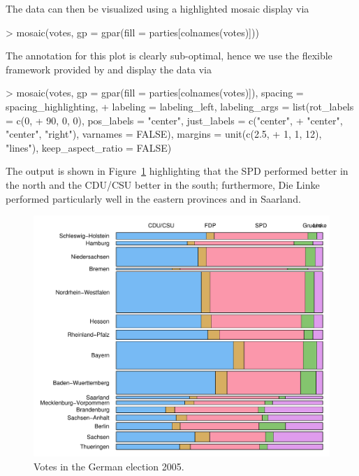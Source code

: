 \documentclass{Z}
\begin{document}
The data can then be visualized using a highlighted mosaic display via
\begin{Schunk}
\begin{Sinput}
> mosaic(votes, gp = gpar(fill = parties[colnames(votes)]))
\end{Sinput}
\end{Schunk}
The annotation for this plot is clearly sub-optimal, hence we use the 
flexible  framework provided by  and display
the data via
\begin{Schunk}
\begin{Sinput}
> mosaic(votes, gp = gpar(fill = parties[colnames(votes)]), spacing = spacing_highlighting, 
+     labeling = labeling_left, labeling_args = list(rot_labels = c(0, 
+         90, 0, 0), pos_labels = "center", just_labels = c("center", 
+         "center", "center", "right"), varnames = FALSE), margins = unit(c(2.5, 
+         1, 1, 12), "lines"), keep_aspect_ratio = FALSE)
\end{Sinput}
\end{Schunk}
The output is shown in Figure~\ref{fig:votes} highlighting that
the SPD performed better in the north and the CDU/CSU better in the south; furthermore,
Die Linke performed particularly well in the eastern provinces and in Saarland.


\begin{figure}[p]
\begin{center}
\includegraphics{hcl-colors-votes1}
\caption{\label{fig:votes} Votes in the German election 2005.}
\end{center}
\end{figure}
\end{document}
